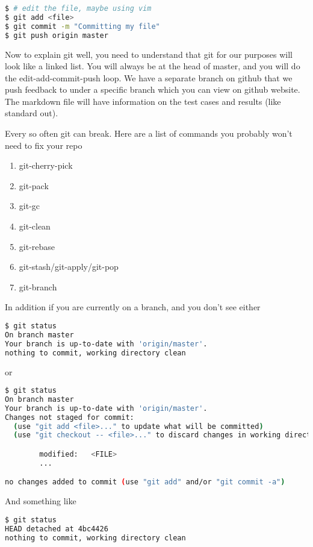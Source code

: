 \begin{lstlisting}[language=bash]
$ # edit the file, maybe using vim
$ git add <file>
$ git commit -m "Committing my file"
$ git push origin master
\end{lstlisting}

Now to explain git well, you need to understand that git for our purposes will look like a linked list.
You will always be at the head of master, and you will do the edit-add-commit-push loop. We have a separate branch on github that we push feedback to under a specific branch which you can view on github website. The markdown file will have information on the test cases and results (like standard out).

Every so often git can break. Here are a list of commands you probably won't need to fix your repo

\begin{enumerate}
\item git-cherry-pick
\item git-pack
\item git-gc
\item git-clean
\item git-rebase
\item git-stash/git-apply/git-pop
\item git-branch
\end{enumerate}

In addition if you are currently on a branch, and you don't see either

\begin{lstlisting}[language=bash]
$ git status
On branch master
Your branch is up-to-date with 'origin/master'.
nothing to commit, working directory clean
\end{lstlisting}

or

\begin{lstlisting}[language=bash]
$ git status
On branch master
Your branch is up-to-date with 'origin/master'.
Changes not staged for commit:
  (use "git add <file>..." to update what will be committed)
  (use "git checkout -- <file>..." to discard changes in working directory)

        modified:   <FILE>
        ...

no changes added to commit (use "git add" and/or "git commit -a")
\end{lstlisting}

And something like

\begin{lstlisting}[language=bash]
$ git status
HEAD detached at 4bc4426
nothing to commit, working directory clean
\end{lstlisting}

